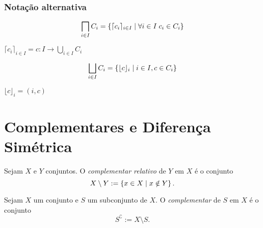 

\subsubsection*{Notação alternativa}

\begin{equation*}
\prod_{i \in I} C_i = \set{\lceil c_i \rceil_{i \in I}}{\forall i \in I \; c_i \in C_i}
\end{equation*}

$\lceil c_i \rceil_{i \in I} = c: I \to \bigcup_{i \in I} C_i$

\begin{equation*}
\bigsqcup_{i \in I} C_i = \left\{\lfloor c \rfloor_i \;\middle\vert\; i \in I, c \in C_i \right\}
\end{equation*}

$\lfloor c \rfloor_i = (i,c)$




\section{Complementares e Diferença Simétrica}

\begin{defi}
Sejam $X$ e $Y$ conjuntos. O \emph{complementar relativo} de $Y$ em $X$ é o conjunto
	\begin{equation*}
	X \setminus Y := \left\{x \in X \;\middle\vert\; x \notin Y \right\}.
	\end{equation*}
\end{defi}

\begin{defi}
Sejam $X$ um conjunto e $S$ um subconjunto de $X$. O \emph{complementar} de $S$ em $X$ é o conjunto
	\begin{equation*}
	S^\complement := X \setminus S.
	\end{equation*}
\end{defi}

